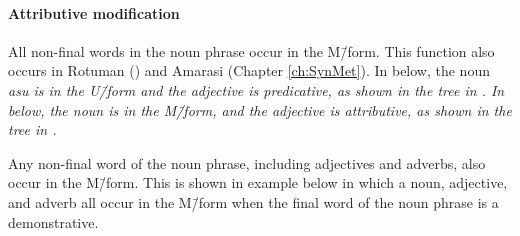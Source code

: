\paragraph{Attributive modification}\label{sec:LetMod}
All non-final words in the noun phrase occur in the M\=/form.
This function also occurs in Rotuman ()
and Amarasi (Chapter \ref{ch:SynMet}).
In  below, the noun \it{asu} is in the U\=/form and the adjective is predicative,
as shown in the tree in .
In  below, the noun is in the M\=/form,
and the adjective is attributive, as shown in the tree in .

\begin{multicols}{2}
	\begin{exe}\let\eachwordone=\itshape
		\label{ex:LetAM2}
		\label{ex:LetAM1}
	\end{exe}
\end{multicols}

\begin{multicols}{2}
	\begin{exe}
		\label{tr:LetTre1}
		\label{tr:LetTre2}
	\end{exe}
\end{multicols}

Any non-final word of the noun phrase,
including adjectives and adverbs, also occur in the M\=/form.
This is shown in example  below
in which a noun, adjective, and adverb all occur in the M\=/form
when the final word of the noun phrase is a demonstrative.

